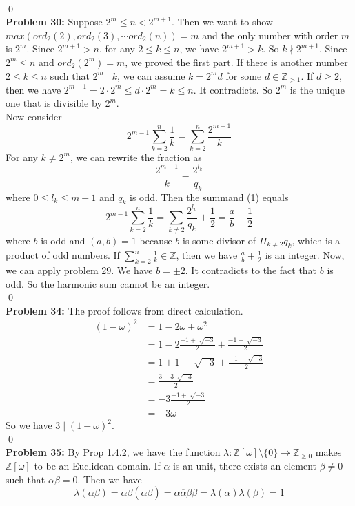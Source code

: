 \documentclass[12pt]{amsart}
\newcommand{\Z}{\mathbb{Z}}
\begin{document}
\\\qed\\
\textbf{Problem 30:}  Suppose $ 2^m\leq n<2^{m+1}$. Then we want to show $max(ord_2(2),ord_2(3),\cdots ord_2(n))=m$ and the only number with order $m$ is $2^m$. Since $2^{m+1}>n$, for any $2\leq k\leq n$, we have $2^{m+1}>k$. So $k\nmid 2^{m+1}$. Since $2^m\leq n$ and $ord_2(2^m)=m$, we proved the first part. If there is another number $2\leq k\leq n$ such that $2^m\mid k$, we can assume $k=2^md$ for some $d\in \Z_{>1}$. If $d\geq 2$, then we have $2^{m+1}=2\cdot 2^m\leq d\cdot 2^m=k\leq n$. It contradicts. So $2^m$ is the unique one that is divisible by $2^m$.\\
Now consider 
\[2^{m-1}\sum_{k=2}^n\frac{1}{k}=\sum_{k=2}^n\frac{2^{m-1}}{k}\tag{1}\]
For any $k\neq 2^m$, we can rewrite the fraction as 
\[\frac{2^{m-1}}{k}=\frac{2^{l_k}}{q_k}\]
where $0\leq l_k\leq m-1$ and $q_k$ is odd. Then the summand (1) equals
\[2^{m-1}\sum_{k=2}^n\frac{1}{k}\tag{1}=\sum_{k\neq 2}\frac{2^{l_k}}{q_k}+\frac{1}{2}=\frac{a}{b}+\frac{1}{2}\]
where $b$ is odd and $(a,b)=1$ because $b$ is some divisor of $\Pi_{k\neq 2}q_k$, which is a product of odd numbers. If $\sum_{k=2}^n\frac{1}{k}\in \Z$, then we have $\frac{a}{b}+\frac{1}{2}$ is an integer. Now, we can apply problem 29. We have $b=\pm 2$. It contradicts to the fact that $b$ is odd. So the harmonic sum cannot be an integer.
\\\qed\\
\textbf{Problem 34:} The proof follows from direct calculation.
\begin{align*}
    (1-\omega)^2&=1-2\omega+\omega^2\\
    &=1-2\frac{-1+\sqrt[]{-3}}{2}+\frac{-1-\sqrt[]{-3}}{2}\\
    &=1+1-\sqrt[]{-3}+\frac{-1-\sqrt[]{-3}}{2}\\
    &=\frac{3-3\ \sqrt[]{-3}}{2}\\
    &=-3\frac{-1+\sqrt[]{-3}}{2}\\
    &=-3\omega
\end{align*}
So we have $3\mid (1-\omega)^2$.
\\\qed\\
\textbf{Problem 35:} By Prop 1.4.2, we have the function $\lambda:\Z[\omega]\setminus\{0\}\to \Z_{\geq 0}$ makes $\Z[\omega]$ to be an Euclidean domain. If $\alpha$ is an unit, there exists an element $\beta\neq 0$ such that $\alpha\beta=0$. Then we have 
\[\lambda(\alpha\beta)=\alpha\beta(\overline{\alpha\beta})=\alpha\overline{\alpha}\beta\overline{\beta}=\lambda(\alpha)\lambda(\beta)=1\]
\end{document}
